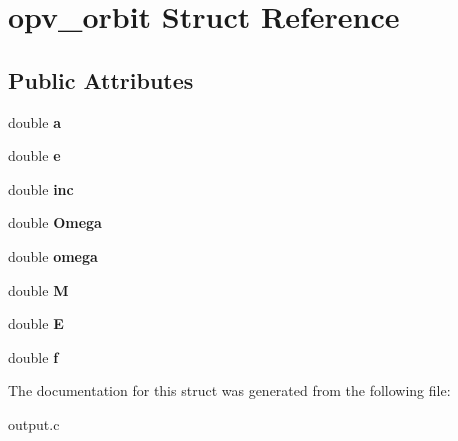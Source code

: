 \hypertarget{structopv__orbit}{
\section{opv\_\-orbit Struct Reference}
\label{structopv__orbit}
}
\subsection*{Public Attributes}
\begin{DoxyCompactItemize}
\item 
\hypertarget{structopv__orbit_a5b5aa40c09e8d6215019ac18b77538d3}{
double {\bfseries a}}
\label{structopv__orbit_a5b5aa40c09e8d6215019ac18b77538d3}

\item 
\hypertarget{structopv__orbit_af433bc9d191d27e2add77932969443e1}{
double {\bfseries e}}
\label{structopv__orbit_af433bc9d191d27e2add77932969443e1}

\item 
\hypertarget{structopv__orbit_a6a1f42c9d7a92ab8100782178c75ed79}{
double {\bfseries inc}}
\label{structopv__orbit_a6a1f42c9d7a92ab8100782178c75ed79}

\item 
\hypertarget{structopv__orbit_a4e00e8c1bc3fdbf5a38066b75005b65f}{
double {\bfseries Omega}}
\label{structopv__orbit_a4e00e8c1bc3fdbf5a38066b75005b65f}

\item 
\hypertarget{structopv__orbit_a550d6082fe261c86c6e9cdaa6bf055a5}{
double {\bfseries omega}}
\label{structopv__orbit_a550d6082fe261c86c6e9cdaa6bf055a5}

\item 
\hypertarget{structopv__orbit_a507a84b62d5e61c311e1e0f57a47082f}{
double {\bfseries M}}
\label{structopv__orbit_a507a84b62d5e61c311e1e0f57a47082f}

\item 
\hypertarget{structopv__orbit_a8bab087ffbbdd9456e5f80e02d60b76f}{
double {\bfseries E}}
\label{structopv__orbit_a8bab087ffbbdd9456e5f80e02d60b76f}

\item 
\hypertarget{structopv__orbit_a3405aadb033b21f49fa25f6ca83ee155}{
double {\bfseries f}}
\label{structopv__orbit_a3405aadb033b21f49fa25f6ca83ee155}

\end{DoxyCompactItemize}


The documentation for this struct was generated from the following file:\begin{DoxyCompactItemize}
\item 
output.c\end{DoxyCompactItemize}
